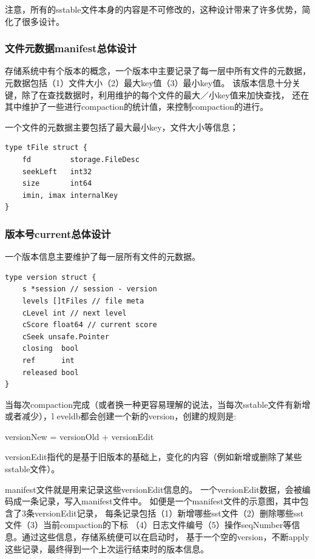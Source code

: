 		注意，所有的sstable文件本身的内容是不可修改的，这种设计带来了许多优势，简化了很多设计。

		\subsubsection{文件元数据manifest总体设计}

		存储系统中有个版本的概念，一个版本中主要记录了每一层中所有文件的元数据，
		元数据包括（1）文件大小（2）最大key值（3）最小key值。
		该版本信息十分关键，除了在查找数据时，利用维护的每个文件的最大／小key值来加快查找，
		还在其中维护了一些进行compaction的统计值，来控制compaction的进行。

		一个文件的元数据主要包括了最大最小key，文件大小等信息；
		
		\begin{lstlisting}[caption=tFile , label=code_radds_storage_tfile]
type tFile struct {
    fd         storage.FileDesc
	seekLeft   int32
    size       int64
    imin, imax internalKey
}
		\end{lstlisting}

		\subsubsection{版本号current总体设计}

		一个版本信息主要维护了每一层所有文件的元数据。
		\begin{lstlisting}[caption=tFile , label=code_radds_storage_tfile]
type version struct {
    s *session // session - version
    levels []tFiles // file meta
    cLevel int // next level
    cScore float64 // current score
    cSeek unsafe.Pointer
    closing  bool
    ref      int
    released bool
}
		\end{lstlisting}

		当每次compaction完成（或者换一种更容易理解的说法，当每次sstable文件有新增或者减少），l
		eveldb都会创建一个新的version，创建的规则是:

		versionNew = versionOld + versionEdit

		versionEdit指代的是基于旧版本的基础上，变化的内容（例如新增或删除了某些sstable文件）。

		manifest文件就是用来记录这些versionEdit信息的。
		一个versionEdit数据，会被编码成一条记录，写入manifest文件中。
		如便是一个manifest文件的示意图，其中包含了3条versionEdit记录，
		每条记录包括（1）新增哪些sst文件（2）删除哪些sst文件（3）当前compaction的下标
		（4）日志文件编号（5）操作seqNumber等信息。通过这些信息，存储系统便可以在启动时，
		基于一个空的version，不断apply这些记录，最终得到一个上次运行结束时的版本信息。

